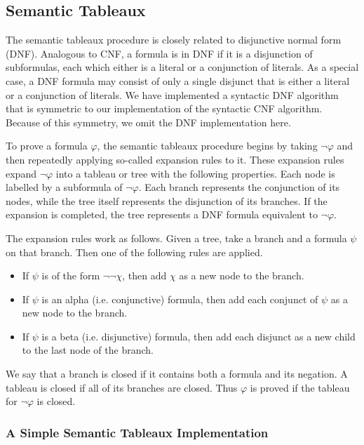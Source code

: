 \documentclass[a4paper,notitlepage]{scrartcl}
\let\phi\varphi
\begin{document}
\subsection{Semantic Tableaux}

The semantic tableaux procedure is closely related to disjunctive normal form
(DNF). Analogous to CNF, a formula is in DNF if it is a disjunction of
subformulas, each which either is a literal or a conjunction of literals. As a
special case, a DNF formula may consist of only a single disjunct that is
either a literal or a conjunction of literals. We have implemented a syntactic
DNF algorithm that is symmetric to our implementation of the syntactic CNF
algorithm. Because of this symmetry, we omit the DNF implementation here.

To prove a formula $\phi$, the semantic tableaux procedure begins by taking
$\lnot\phi$ and then repeatedly applying so-called expansion rules to it. These
expansion rules expand $\lnot\phi$ into a tableau or tree with the following
properties. Each node is labelled by a subformula of $\lnot\phi$. Each branch
represents the conjunction of its nodes, while the tree itself represents the
disjunction of its branches. If the expansion is completed, the tree represents
a DNF formula equivalent to $\lnot\phi$.

The expansion rules work as follows. Given a tree, take a branch and a formula
$\psi$ on that branch. Then one of the following rules are applied.

\begin{itemize}
\item
If $\psi$ is of the form $\lnot\lnot\chi$, then add $\chi$ as a new node to the
branch.

\item
If $\psi$ is an alpha (i.e. conjunctive) formula, then add each conjunct of
$\psi$ as a new node to the branch.

\item
If $\psi$ is a beta (i.e. disjunctive) formula, then add each disjunct as a
new child to the last node of the branch.
\end{itemize}

We say that a branch is closed if it contains both a formula and its negation.
A tableau is closed if all of its branches are closed. Thus $\phi$ is proved if
the tableau for $\lnot\phi$ is closed.

\subsubsection{A Simple Semantic Tableaux Implementation}
\end{document}
